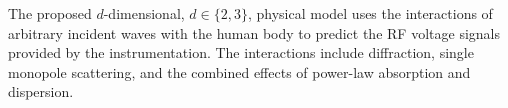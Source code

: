 The proposed $d$-dimensional, $d \in \{ 2, 3 \}$, physical model uses
the interactions of
arbitrary incident waves with
the human body to predict
the \ac{RF} voltage signals provided by
the instrumentation.
The interactions include
diffraction,
single monopole scattering, and
the combined effects of
power-law absorption and
dispersion.
